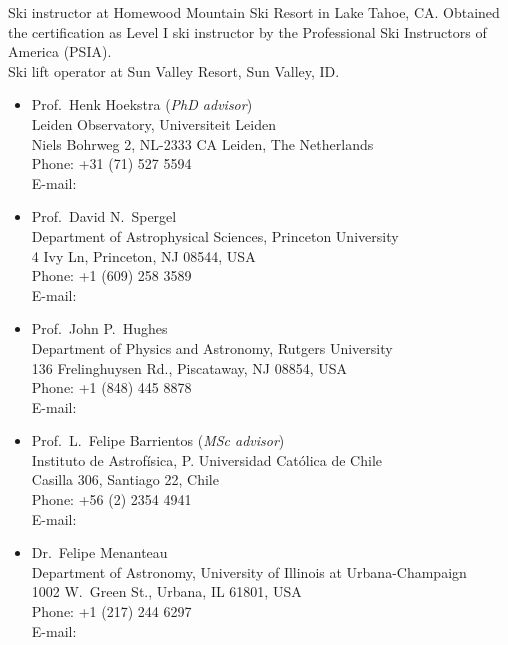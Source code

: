 \documentclass[11pt]{article}
\begin{document}

\noindent
{} Ski instructor at Homewood Mountain Ski Resort in Lake Tahoe, CA. Obtained the certification as Level I ski instructor  by the Professional Ski Instructors of America (PSIA).\\
 Ski lift operator at Sun Valley Resort, Sun Valley, ID.\\

\hline
\vspace{0.5cm}

\pagebreak



\begin{itemize}
 \item Prof.~Henk Hoekstra (\textit{PhD advisor})\\
       Leiden Observatory, Universiteit Leiden\\
       Niels Bohrweg 2, NL-2333 CA Leiden, The Netherlands\\
       Phone: +31 (71) 527 5594\\
       E-mail: 
 \item Prof.~David N.~Spergel\\
       Department of Astrophysical Sciences, Princeton University\\
       4 Ivy Ln, Princeton, NJ 08544, USA\\
       Phone: +1 (609) 258 3589\\
       E-mail: 
 \item Prof.~John P.~Hughes\\
       Department of Physics and Astronomy, Rutgers University\\
       136 Frelinghuysen Rd., Piscataway, NJ 08854, USA\\
       Phone: +1 (848) 445 8878\\
       E-mail: 
 \item Prof.~L.~Felipe Barrientos (\textit{MSc advisor})\\
       Instituto de Astrof\'isica, P. Universidad Cat\'olica de Chile\\
       Casilla 306, Santiago 22, Chile\\
       Phone: +56 (2) 2354 4941\\
       E-mail: 
 \item Dr.~Felipe Menanteau\\
       Department of Astronomy, University of Illinois at Urbana-Champaign\\
       1002 W.\ Green St., Urbana, IL 61801, USA\\
       Phone: +1 (217) 244 6297\\
       E-mail: 
\end{itemize}
\end{document}
